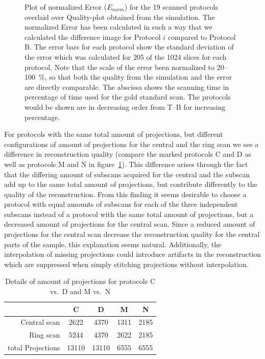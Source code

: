 \cbstart
\begin{figure}[htp]
	\centering
	
	\caption{Plot of normalized Error (\(E_{norm}\)) for the 19 scanned protocols overlaid over Quality-plot obtained from the simulation. The normalized Error has been calculated in such a way that we calculated the difference image for Protocol $i$ compared to Protocol B. The error bars for each protocol show the standard deviation of the error which was calculated for 205 of the 1024 slices for each protocol. Note that the scale of the error been normalized to 20--\SI{100}{\percent}, so that both the quality from the simulation and the error are directly comparable. The abscissa shows the scanning time in percentage of time used for the gold standard scan. The protocols would be shown are in decreasing order from T--B for increasing percentage.}
	\label{fig:NormalizedErrorPlot}
\end{figure}
\cbend

\cbstart
For protocols with the same total amount of projections, but different configurations of amount of projections for the central and the ring scan we see a difference in reconstruction quality (compare the marked protocols C and D as well as protocols M and N in figure~\ref{fig:NormalizedErrorPlot}). This difference arises through the fact that the differing amount of subscans acquired for the central and the subscan add up to the same total amount of projections, but contribute differently to the quality of the reconstruction. From this finding it seems desirable to choose a protocol with equal amounts of subscans for each of the three independent subscans instead of a protocol with the same total amount of projections, but a decreased amount of projections for the central scan. Since a reduced amount of projections for the central scan decrease the reconstruction quality for the central parts of the sample, this explanation seems natural. Additionally, the interpolation of missing projections could introduce artifacts in the reconstruction which are suppressed when simply stitching projections without interpolation.
\cbend

\begin{table}%
	\centering
	\caption{Details of amount of projections for protocols C vs.\ D and M vs.\ N}%
	\begin{tabular}{rcccc}%
		\toprule%
							& C 	& D 	& M 	& N \\%
		\midrule%
		Central scan		& 2622 	& 4370	& 1311 	& 2185 \\%
		Ring scan	 		& 5244 	& 4370  & 2622 	& 2185 \\%
		\midrule%
		total Projections	& 13110	& 13110	& 6555	& 6555 \\%
		\bottomrule%
	\end{tabular}%
	\label{tab:detailsCDMN}%
\end{table}

